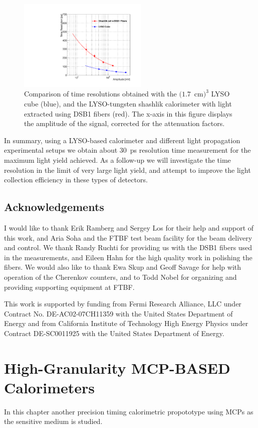 \begin{figure}[h] \centering
\includegraphics[width=0.55\textwidth]{figs/TimeResolutionVsEnergy_ShashlikDSB1FiberAndCube} 
\caption{\small Comparison of time resolutions obtained with the $(1.7$~cm$)^{3}$ LYSO cube (blue), 
and the LYSO-tungsten shashlik calorimeter with light extracted using DSB1 fibers (red). 
 The x-axis in this figure displays the amplitude of the
signal, corrected for the attenuation factors. }
\label{fig:ShashlikFiberAndCubeTOF}
\end{figure}

In summary, using a LYSO-based calorimeter and different light propagation experimental setups 
we obtain about $30$~ps resolution time measurement for the maximum light yield achieved. 
As a follow-up we will investigate the time resolution in the limit of very large light yield, 
and attempt to improve the light collection efficiency in these types of detectors.

\section{Acknowledgements} 
I would like to thank Erik Ramberg and Sergey Los for their help and support of this work, and Aria Soha and the FTBF test beam facility for
the beam delivery and control. We thank Randy Ruchti for providing us with
the DSB1 fibers used in the measurements, and Eileen Hahn for the high quality
work in polishing the fibers. We would also like to thank Ewa Skup and Geoff Savage for help with
operation of the Cherenkov counters, and to Todd Nobel for organizing and providing
supporting equipment at FTBF.

This work is supported by funding from Fermi Research Alliance, LLC under Contract No. DE-AC02-07CH11359 with the United States Department of Energy and from California Institute of Technology High Energy Physics under Contract DE-SC0011925 with the United States Department of Energy. 

\clearpage
\chapter{High-Granularity MCP-BASED Calorimeters}\label{mcp-cal}
In this chapter another precision timing calorimetric propototype
using MCPs as the sensitive medium is studied.

